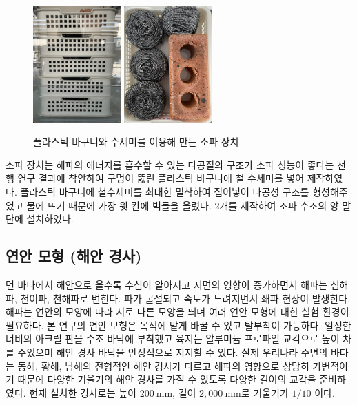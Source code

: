 \begin{figure}[H]
	\begin{center}
		\includegraphics[width=0.3\textwidth]{images/sopagi1.jpg}
		\includegraphics[width=0.3\textwidth]{images/sopagi2.jpg}
		\caption{플라스틱 바구니와 수세미를 이용해 만든 소파 장치}
		\label{Waveabsorber}
	\end{center}
\end{figure}

소파 장치는 해파의 에너지를 흡수할 수 있는 다공질의 구조가 소파 성능이 좋다는 선행 연구 결과에 착안하여 구멍이 뚫린 플라스틱 바구니에 철 수세미를 넣어 제작하였다\cite{lim2014optimum, o2017methods}. 플라스틱 바구니에 철수세미를 최대한 밀착하여 집어넣어 다공성 구조를 형성해주었고 물에 뜨기 때문에 가장 윗 칸에 벽돌을 올렸다. 2개를 제작하여 조파 수조의 양 말단에 설치하였다.

\subsection{연안 모형 (해안 경사)}

먼 바다에서 해안으로 올수록 수심이 얕아지고 지면의 영향이 증가하면서 해파는 심해파, 천이파, 천해파로 변한다. 파가 굴절되고 속도가 느려지면서 쇄파 현상이 발생한다. 해파는 연안의 모양에 따라 서로 다른 모양을 띄며 여러 연안 모형에 대한 실험 환경이 필요하다. 본 연구의 연안 모형은 목적에 맡게 바꿀 수 있고 탈부착이 가능하다. 일정한 너비의 아크릴 판을 수조 바닥에 부착했고 육지는 알루미늄 프로파일 교각으로 높이 차를 주었으며 해안 경사 바닥을 안정적으로 지지할 수 있다. 실제 우리나라 주변의 바다는 동해, 황해, 남해의 전형적인 해안 경사가 다르고 해파의 영향으로 상당히 가변적이기 때문에 다양한 기울기의 해안 경사를 가질 수 있도록 다양한 길이의 교각을 준비하였다. 현재 설치한 경사로는 높이 $200\mathrm{~mm}$, 길이 $2,000\mathrm{~mm}$로 기울기가 $1/10$ 이다. 

